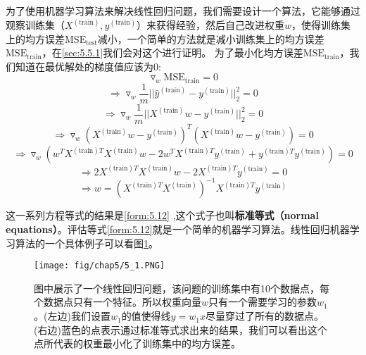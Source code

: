 为了使用机器学习算法来解决线性回归问题，我们需要设计一个算法，它能够通过观察训练集（$X^{(\mathrm{train})},y^{(\mathrm{train})}$）来获得经验，然后自己改进权重$w$，使得训练集上的均方误差$\mathrm{MSE}_{\mathrm{test}}$减小，一个简单的方法就是减小训练集上的均方误差$\mathrm{MSE}_{\mathrm{train}}$，在\ref{sec:5.5.1}我们会对这个进行证明。
为了最小化均方误差$\mathrm{MSE}_{\mathrm{train}}$，我们知道在最优解处的梯度值应该为$0$:
\begin{equation}
   \triangledown _w \mathrm{MSE}_{\mathrm{train}}=0
\end{equation}
\begin{equation}
   \Rightarrow \triangledown _w \frac{1}{m}||\hat{y}^{(\mathrm{train})}-y^{(\mathrm{train})}||_{2}^{2}=0
\end{equation}
\begin{equation}
   \Rightarrow \triangledown _w \frac{1}{m}||X^{(\mathrm{train})}w-y^{(\mathrm{train})}||_{2}^{2}=0
\end{equation}
\begin{equation}
   \Rightarrow \triangledown _w (X^{(\mathrm{train})}w-y^{(\mathrm{train})})^{T}(X^{(\mathrm{train})}w-y^{(\mathrm{train})})=0
\end{equation}
\begin{equation}
   \Rightarrow \triangledown _w(w^{T}X^{(\mathrm{train})T}X^{(\mathrm{train})}w-2w^{T}X^{(\mathrm{train})T}y^{(\mathrm{train})}+y^{(\mathrm{train})T}y^{(\mathrm{train})})=0
\end{equation}
\begin{equation}
 \Rightarrow 2X^{(\mathrm{train})T}X^{(\mathrm{train})}w-2X^{(\mathrm{train})T}y^{(\mathrm{train})}=0
\end{equation}
\begin{equation}
  \Rightarrow w=(X^{(\mathrm{train})T}X^{(\mathrm{train})})^{-1}X^{(\mathrm{train})T}y^{(\mathrm{train})}
  \label{form:5.12}
\end{equation}

这一系列方程等式的结果是\ref{form:5.12}  ,这个式子也叫\textbf{标准等式（normal equations）}。评估等式\ref{form:5.12}就是一个简单的机器学习算法。线性回归机器学习算法的一个具体例子可以看图\ref{fig:5_1}。

\begin{figure}[htbp] %
   \centering
   \texttt{[image: fig/chap5/5\_1.PNG]} 
   \caption{图中展示了一个线性回归问题，该问题的训练集中有10个数据点，每个数据点只有一个特征。所以权重向量$w$只有一个需要学习的参数$w_1$ 。(左边)我们设置$w_1$的值使得线$y=w_1x$尽量穿过了所有的数据点。(右边)蓝色的点表示通过标准等式求出来的结果，我们可以看出这个点所代表的权重最小化了训练集中的均方误差。}
   \label{fig:5_1}
\end{figure}

